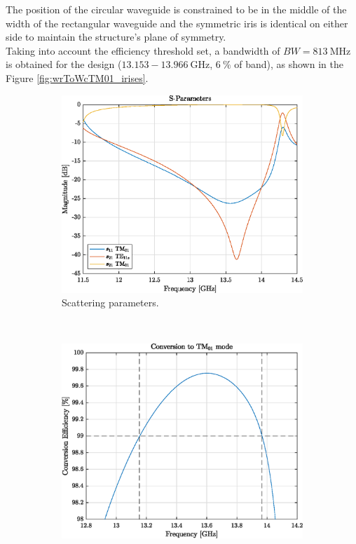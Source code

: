\documentclass[english,twoside]{article}
\begin{document}
		The position of the circular waveguide is constrained to be in the middle of the width of the rectangular waveguide and the symmetric iris is identical on either side to maintain the structure's plane of symmetry.\\
		
		Taking into account the efficiency threshold set, a bandwidth of $BW=\SI{813}{\mega\hertz}$ is obtained for the design ($\num{13.153}-\SI{13.966}{\giga\hertz}$, $\SI{6}{\percent}$ of band), as shown in the Figure \ref{fig:wrToWcTM01_irises}.
		
		\begin{figure}[H]
			\centering			
			\begin{subfigure}[b]{0.48\textwidth}
				\includegraphics[width=\textwidth]{figures/wrToWcTM01_irises}
				\caption{Scattering parameters.}
			\end{subfigure}
			~
			\begin{subfigure}[b]{0.48\textwidth}
				\includegraphics[width=\textwidth]{figures/wrToWcTM01_irises_eff}

\end{subfigure}
\end{figure}
\end{document}
